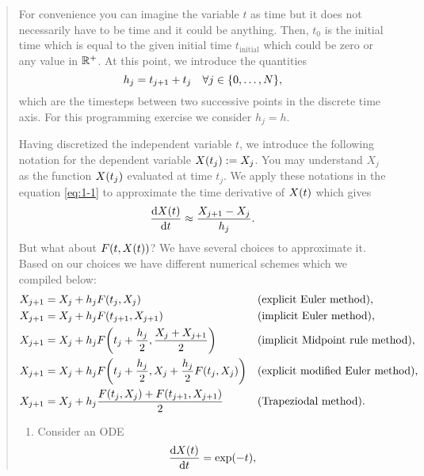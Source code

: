 \documentclass[english]{exercise}
\begin{document}
\begin{quote}
		For convenience you can imagine the variable \(t\) as time but it does not necessarily have to be time and it could be anything.
		Then, \(t_0\) is the initial time which is equal to the given initial time \(t_{\text{initial}}\) which could be zero or any value in \(\mathbb{R}^+\).
		At this point, we introduce the quantities
		\begin{equation}
			h_j = t_{j + 1} + t_j \quad \forall j \in \braces*{0, \ldots, N},
		\end{equation}
		which are the timesteps between two successive points in the discrete time axis.
		For this programming exercise we consider \(h_j = h\).

		Having discretized the independent variable \(t\), we introduce the following notation for the dependent variable \(X\parentheses*{t_j} := X_j\).
		You may understand \(X_j\) as the function \(X\parentheses*{t_j}\) evaluated at time \(t_j\).
		We apply these notations in the equation \eqref{eq:1-1} to approximate the time derivative of \(X\parentheses*{t}\) which gives
		\begin{equation}
			\frac{\d X\parentheses*{t}}{\d t} \approx \frac{X_{j + 1} - X_j}{h_j}.
		\end{equation}
		But what about \(F\parentheses*{t, X\parentheses*{t}}\)?
		We have several choices to approximate it.
		Based on our choices we have different numerical schemes which we compiled below:
		\begin{align}
			X_{j + 1} &= X_j + h_j F\parentheses*{t_j, X_j} && \text{(explicit Euler method)},\label{eq:1-6}\\
			X_{j + 1} &= X_j + h_j F\parentheses*{t_{j + 1}, X_{j + 1}} && \text{(implicit Euler method)},\\
			X_{j + 1} &= X_j + h_j F\parentheses*{t_j + \frac{h_j}{2}, \frac{X_j + X_{j + 1}}{2}} && \text{(implicit Midpoint rule method)},\\
			X_{j + 1} &= X_j + h_j F\parentheses*{t_j + \frac{h_j}{2}, X_j + \frac{h_j}{2}F\parentheses*{t_j, X_j}} && \text{(explicit modified Euler method)},\\
			X_{j + 1} &= X_j + h_j \frac{F\parentheses*{t_j, X_j} + F\parentheses*{t_{j + 1}, X_{j + 1}}}{2} && \text{(Trapeziodal method)}.\label{eq:1-10}
		\end{align}
		\begin{enumerate}[label=\arabic*.]
			\item Consider an ODE
			\begin{equation}
				\frac{\d X\parentheses*{t}}{\d t} = \exp\parentheses*{-t},

\end{equation}
\end{enumerate}
\end{quote}
\end{document}

